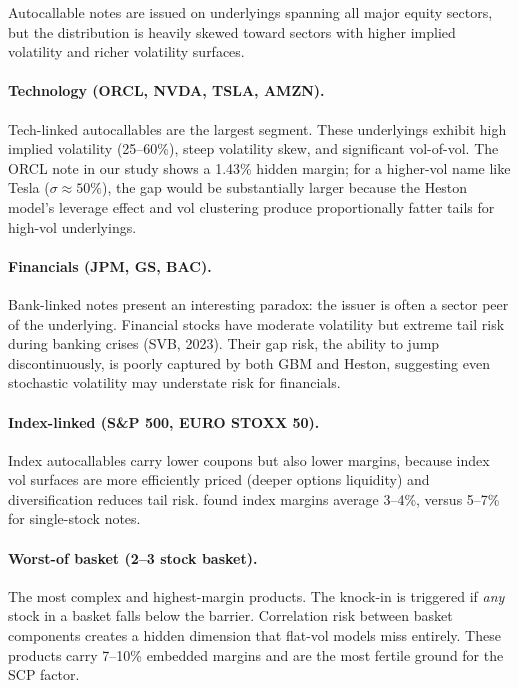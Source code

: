 \documentclass[12pt,a4paper]{article}
\begin{document}
Autocallable notes are issued on underlyings spanning all major equity sectors, but the distribution is heavily skewed toward sectors with higher implied volatility and richer volatility surfaces.

\paragraph{Technology (ORCL, NVDA, TSLA, AMZN).} Tech-linked autocallables are the largest segment. These underlyings exhibit high implied volatility (25--60\%), steep volatility skew, and significant vol-of-vol. The ORCL note in our study shows a 1.43\% hidden margin; for a higher-vol name like Tesla ($\sigma \approx 50\%$), the gap would be substantially larger because the Heston model's leverage effect and vol clustering produce proportionally fatter tails for high-vol underlyings.

\paragraph{Financials (JPM, GS, BAC).} Bank-linked notes present an interesting paradox: the issuer is often a sector peer of the underlying. Financial stocks have moderate volatility but extreme tail risk during banking crises (SVB, 2023). Their gap risk, the ability to jump discontinuously, is poorly captured by both GBM and Heston, suggesting even stochastic volatility may understate risk for financials.

\paragraph{Index-linked (S\&P 500, EURO STOXX 50).} Index autocallables carry lower coupons but also lower margins, because index vol surfaces are more efficiently priced (deeper options liquidity) and diversification reduces tail risk. \citet{celiere2023} found index margins average 3--4\%, versus 5--7\% for single-stock notes.

\paragraph{Worst-of basket (2--3 stock basket).} The most complex and highest-margin products. The knock-in is triggered if \textit{any} stock in a basket falls below the barrier. Correlation risk between basket components creates a hidden dimension that flat-vol models miss entirely. These products carry 7--10\% embedded margins and are the most fertile ground for the SCP factor.
\end{document}
